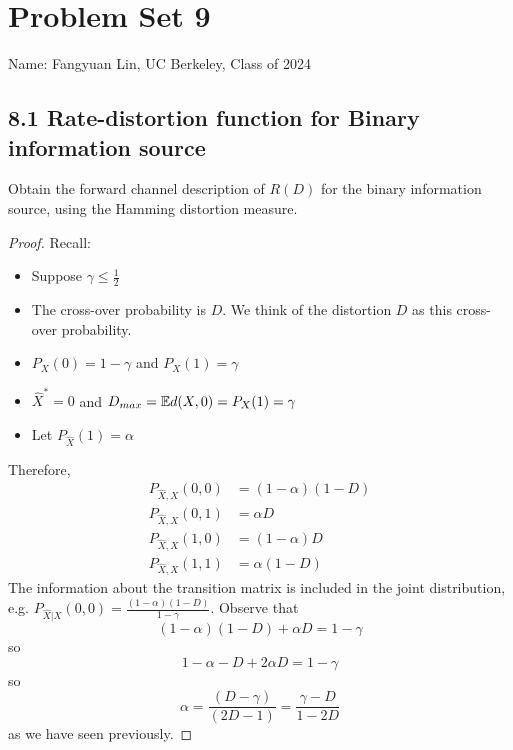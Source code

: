 \documentclass[../main.tex]{subfiles}
\begin{document}
\section*{Problem Set 9}
    Name: Fangyuan Lin, UC Berkeley, Class of 2024
\subsection*{8.1 Rate-distortion function for Binary information source}
Obtain the forward channel description of $R(D)$ for the binary information source, using the Hamming distortion measure.
\begin{proof}
    Recall: \begin{itemize}
        \item Suppose $\gamma \leq \frac{1}{2}$
        \item The cross-over probability is $D.$ We think of the distortion $D$ as this cross-over probability.
        \item $P_X(0)=1-\gamma$ and $P_X(1)=\gamma$
        \item $\hat X^*=0$ and $D_{max}=\mathbb{E} d(X,0)=P_X(1)=\gamma$
        \item Let $P_{\hat X}(1)=\alpha$
    \end{itemize}
    Therefore, \begin{align*}
        P_{\hat X, X}(0,0) &= (1-\alpha)(1-D) \\
        P_{\hat X,X}(0,1) &= \alpha D\\
        P_{\hat X, X} (1,0) &= (1-\alpha) D\\
        P_{\hat X, X} (1,1) &= \alpha (1-D)
    \end{align*}
    The information about the transition matrix is included in the joint distribution, e.g. $P_{\hat X|X}(0,0)=\frac{(1-\alpha)(1-D)}{1-\gamma}.$
    Observe that \[
    (1-\alpha)(1-D) + \alpha D = 1-\gamma
    \] so \[
    1 - \alpha -D + 2\alpha D= 1-\gamma
    \]
    so \[
    \alpha = \frac{(D-\gamma)}{(2D-1)} = \frac{\gamma - D}{1-2D}
    \] as we have seen previously.
\end{proof}
\end{document}
